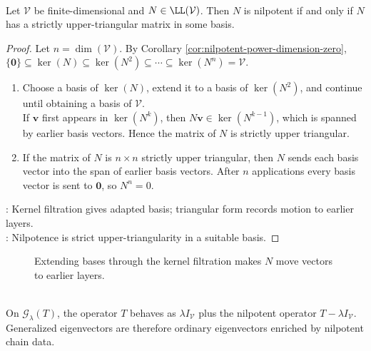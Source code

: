 \begin{theorem} \label{thm:nilpotent-strictly-upper-triangular-matrix} \\
Let $\mathcal{V}$ be finite-dimensional and $N\in\LL(\mathcal{V})$. Then $N$ is nilpotent if and only if $N$ has a strictly upper-triangular matrix in some basis.
\begin{proof}
Let $n=\dim(\mathcal{V})$. By Corollary \ref{cor:nilpotent-power-dimension-zero}, $\{\mathbf{0}\}\subseteq\ker(N)\subseteq\ker(N^2)\subseteq\cdots\subseteq\ker(N^n)=\mathcal{V}$.
\begin{enumerate}[label=\roman*.]
\setlength{\itemsep}{0pt}
\item[$(\Rightarrow)$] Choose a basis of $\ker(N)$, extend it to a basis of $\ker(N^2)$, and continue until obtaining a basis of $\mathcal{V}$.\\
If $\mathbf{v}$ first appears in $\ker(N^k)$, then $N\mathbf{v}\in\ker(N^{k-1})$, which is spanned by earlier basis vectors. Hence the matrix of $N$ is strictly upper triangular.
\item[$(\Leftarrow)$] If the matrix of $N$ is $n\times n$ strictly upper triangular, then $N$ sends each basis vector into the span of earlier basis vectors. After $n$ applications every basis vector is sent to $\mathbf{0}$, so $N^n=0$.
\end{enumerate}
: Kernel filtration gives adapted basis; triangular form records motion to earlier layers.\\
: Nilpotence is strict upper-triangularity in a suitable basis.
\end{proof}
\end{theorem}

\begin{figure}[H]
  \centering
  
  \caption{Extending bases through the kernel filtration makes $N$ move vectors to earlier layers.}
  \label{fig:nilpotent-filtration-basis}
\end{figure}

\begin{perspective} \label{per:generalized-eigenvectors-as-nilpotent-data} \\
On $\mathcal{G}_{\lambda}(T)$, the operator $T$ behaves as $\lambda I_{\mathcal{V}}$ plus the nilpotent operator $T-\lambda I_{\mathcal{V}}$. Generalized eigenvectors are therefore ordinary eigenvectors enriched by nilpotent chain data.
\end{perspective}

